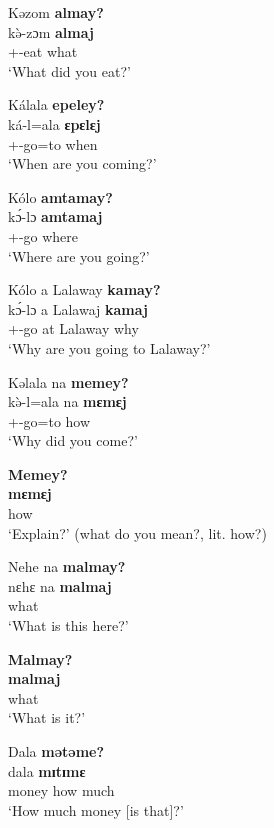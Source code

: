 \ea \label{ex:3:28}
Kəzom  \textbf{almay?}\\
\gll  k\`{ə}-zɔm  \textbf{almaj}\\
      {\twoS}+\PFV-eat  what\\
\glt  ‘What did you eat?’
\z

\ea \label{ex:3:29}
Kálala  \textbf{epeley?}~\\
\gll  ká-l=ala     \textbf{ɛpɛlɛj}~\\
      {\twoS}+{\IFV}-go=to   when\\
\glt  ‘When are you coming?’
\z

\largerpage
\ea \label{ex:3:30}
Kólo  \textbf{amtamay?}~\\
\gll  k\'{ɔ}-lɔ     \textbf{amtamaj}\\
      {\twoS}+\IPV-go    where\\
\glt  ‘Where are you going?’
\z

\ea \label{ex:3:31}
Kólo  a  Lalaway  \textbf{kamay?}\\
\gll  k\'{ɔ}-lɔ   a  Lalawaj    \textbf{kamaj}\\
      {\twoS}+\IFV-go  at  Lalaway    why\\
\glt  ‘Why are you going to Lalaway?’
\z

\ea \label{ex:3:32}
Kəlala  na  \textbf{memey?}\\
\gll  k\`{ə}-l=ala  na  \textbf{mɛmɛj}\\
      {\twoS}+{\PFV}-go=to  {\PSP}  how\\
\glt  ‘Why  did you come?’
\z

\ea \label{ex:3:33}
\textbf{Memey?}\\
\gll  \textbf{mɛmɛj}\\
      how\\
\glt  ‘Explain?’ (what do you mean?, lit. how?)
\z

\ea \label{ex:3:34}
Nehe  na  \textbf{malmay?}\\
\gll  nɛhɛ   na   \textbf{malmaj}\\
      {\DEM}  {\PSP}  what\\
\glt  ‘What is this here?’
\z

\ea \label{ex:3:35}
\textbf{Malmay?}\\
\gll  \textbf{malmaj}\\
      what\\
\glt  ‘What is it?’
\z

\ea \label{ex:3:36}
Dala  \textbf{mətəme?}\\
\gll  dala    \textbf{mɪtɪmɛ}\\
      money  {how much}\\
\glt  ‘How much money [is that]?’
\z

